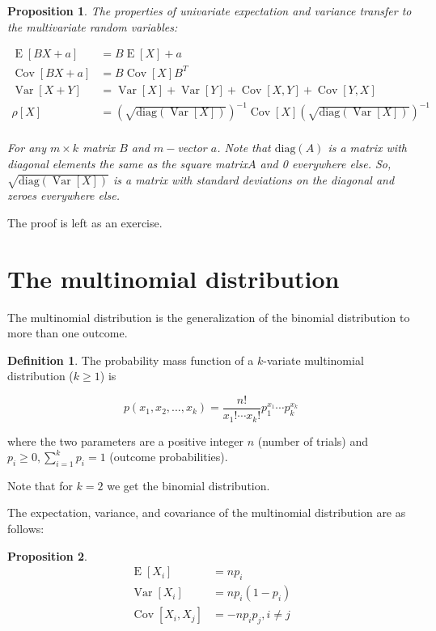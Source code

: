 \documentclass{book}
\theoremstyle{plain}%
\newtheorem{proposition}{Proposition}[section]
\theoremstyle{definition}
\newtheorem{definition}{Definition}[section]
\DeclareMathOperator{\Var}{Var}
\DeclareMathOperator{\Cov}{Cov}
\DeclareMathOperator{\E}{E}
\begin{document}
\begin{proposition} The properties of univariate expectation and variance transfer to the multivariate random variables:

\begin{align*}
\E[BX + a] &= B\E[X] + a\\
\Cov[BX + a] &= B\Cov[X]B^T\\
\Var[X + Y] &= \Var[X] + \Var[Y] + \Cov[X,Y] + \Cov[Y,X]\\
\rho[X] &= \left(\sqrt{\text{diag}(\Var[X])}\right)^{-1} \Cov[X] \left(\sqrt{\text{diag}(\Var[X])}\right)^{-1}\\
\end{align*}

For any $m \times k$ matrix $B$ and $m-$vector $a$. Note that $\text{diag}(A)$ is a matrix with diagonal elements the same as the square matrix$A$ and 0 everywhere else. So, $\sqrt{\text{diag}(\Var[X])}$ is a matrix with standard deviations on the diagonal and zeroes everywhere else. \label{prop:multi}

\end{proposition}

The proof is left as an exercise.

\section{The multinomial distribution}

The multinomial distribution is the generalization of the binomial distribution to more than one outcome.

\begin{definition}
The probability mass function of a $k$-variate multinomial distribution ($k \geq 1$) is

$$p(x_1,x_2,...,x_k) = \frac{n!}{x_1!\cdots x_k!} p_1^{x_1}\cdots p_k^{x_k}$$

where the two parameters are a positive integer $n$ (number of trials) and $p_i \geq 0, \sum_{i=1}^k p_i = 1$ (outcome probabilities).
\end{definition}

Note that for $k=2$ we get the binomial distribution.

The expectation, variance, and covariance of the multinomial distribution are as follows:

\begin{proposition}
\begin{align*}
\E[X_i] &= np_i\\
\Var[X_i] &= np_i(1-p_i)\\
\Cov[X_i,X_j] &= -np_ip_j, i \neq j
\end{align*}\label{prop:multinom}
\end{proposition}
\end{document}

